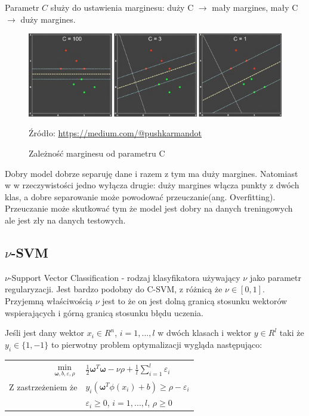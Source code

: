 \documentclass[paper=a4, fontsize=11pt]{scrartcl} %
\numberwithin{equation}{section} %
\numberwithin{figure}{section} %
\newcommand*{\captionsource}[2]{%
  \caption[{#1}]{%
      #1}
    Źródło: #2%
}
\begin{document}
    \par Parametr $C$ służy do ustawienia marginesu: duży C $\rightarrow$ mały margines,
    mały C $\rightarrow$ duży margines.

    \begin{figure}[H]
        \begin{center}
            \includegraphics[scale=0.8]{./img/param_c.png}
            \captionsource{Zależność marginesu od parametru C}{\url{https://medium.com/@pushkarmandot}}
            \label{fig:param_c}
        \end{center}
    \end{figure}

    \par Dobry model dobrze separuję dane i razem z tym ma duży margines. Natomiast w
    w rzeczywistości jedno wyłącza drugie: duży margines włącza punkty z dwóch klas, a
    dobre separowanie może powodować przeuczanie(ang. Overfitting). Przeuczanie może 
    skutkować tym że model jest dobry na danych treningowych ale jest zły na danych testowych.

\newpage %
\subsection{$\nu$-SVM}
    \par $\nu$-Support Vector Classification - rodzaj klasyfikatora używający $\nu$ jako
    parametr regularyzacji. Jest bardzo podobny do C-SVM, z różnicą że $\nu\in[0,1]$.
    Przyjemną właściwością $\nu$ jest to że on jest dolną granicą stosunku wektorów
    wspierających i górną granicą stosunku błędu uczenia.
    \par Jeśli jest dany wektor $x_i \in R^n$, $i=1,...,l$ w dwóch klasach i wektor
    $y\in R^l$ taki że $y_i \in \{1, -1\}$ to pierwotny problem optymalizacji wygląda
    następująco:

    \begin{center}
        \begin{tabular}{rl}
            $\min\limits_{\pmb{\omega},b,\varepsilon, \rho}$ &
            $\frac{1}{2}\pmb{\omega}^T\pmb{\omega} - \nu\rho + \frac{1}{l}\sum\limits_{i=1}^{l}
            \varepsilon_i$ \\
            Z zastrzeżeniem że & $y_i(\pmb{\omega}^T\phi(x_i) + b) \geq \rho - \varepsilon_i$ \\
                               & $\varepsilon_i \geq 0$, $i=1,...,l$, $\rho \geq 0$
        \end{tabular}
    \end{center}
\end{document}
